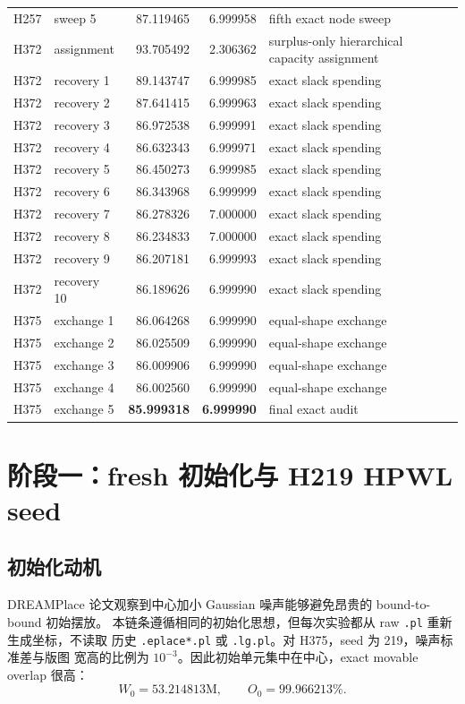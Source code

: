 \documentclass[UTF8,a4paper,11pt]{ctexrep}
\begin{document}
\begin{longtable}{p{1.35cm}p{2.45cm}r r p{5.6cm}}
H257 & sweep 5 & 87.119465 & 6.999958 & fifth exact node sweep\\
H372 & assignment & 93.705492 & 2.306362 & surplus-only hierarchical capacity assignment\\
H372 & recovery 1 & 89.143747 & 6.999985 & exact slack spending\\
H372 & recovery 2 & 87.641415 & 6.999963 & exact slack spending\\
H372 & recovery 3 & 86.972538 & 6.999991 & exact slack spending\\
H372 & recovery 4 & 86.632343 & 6.999971 & exact slack spending\\
H372 & recovery 5 & 86.450273 & 6.999985 & exact slack spending\\
H372 & recovery 6 & 86.343968 & 6.999999 & exact slack spending\\
H372 & recovery 7 & 86.278326 & 7.000000 & exact slack spending\\
H372 & recovery 8 & 86.234833 & 7.000000 & exact slack spending\\
H372 & recovery 9 & 86.207181 & 6.999993 & exact slack spending\\
H372 & recovery 10 & 86.189626 & 6.999990 & exact slack spending\\
H375 & exchange 1 & 86.064268 & 6.999990 & equal-shape exchange\\
H375 & exchange 2 & 86.025509 & 6.999990 & equal-shape exchange\\
H375 & exchange 3 & 86.009906 & 6.999990 & equal-shape exchange\\
H375 & exchange 4 & 86.002560 & 6.999990 & equal-shape exchange\\
H375 & exchange 5 & \textbf{85.999318} & \textbf{6.999990} & final exact audit\\
\end{longtable}

\chapter{阶段一：fresh 初始化与 H219 HPWL seed}

\section{初始化动机}
DREAMPlace 论文观察到中心加小 Gaussian 噪声能够避免昂贵的 bound-to-bound 初始摆放。
本链条遵循相同的初始化思想，但每次实验都从 raw \texttt{.pl} 重新生成坐标，不读取
历史 \texttt{.eplace*.pl} 或 \texttt{.lg.pl}。对 H375，seed 为 219，噪声标准差与版图
宽高的比例为 $10^{-3}$。因此初始单元集中在中心，exact movable overlap 很高：
\[
  W_0=53.214813\text{M},\qquad O_0=99.966213\%.
\]
\end{document}
